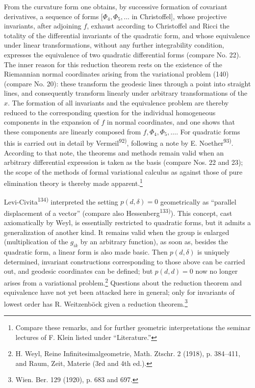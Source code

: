 \documentclass[11pt]{article}
\begin{document}
From the curvature form one obtains, by successive formation of covariant derivatives, a sequence of forms $[\Phi_4,\Phi_5,\ldots$ in Christoffel], whose projective invariants, after adjoining $f$, exhaust according to Christoffel and Ricci the totality of the differential invariants of the quadratic form, and whose equivalence under linear transformations, without any further integrability condition, expresses the equivalence of two quadratic differential forms (compare No. 22). The inner reason for this reduction theorem rests on the existence of the Riemannian normal coordinates arising from the variational problem (140) (compare No. 20): these transform the geodesic lines through a point into straight lines, and consequently transform linearly under arbitrary transformations of the $x$. The formation of all invariants and the equivalence problem are thereby reduced to the corresponding question for the individual homogeneous components in the expansion of $f$ in normal coordinates, and one shows that these components are linearly composed from $f,\Phi_4,\Phi_5,\ldots$. For quadratic forms this is carried out in detail by Vermeil\textsuperscript{92)}, following a note by E. Noether\textsuperscript{93)}. According to that note, the theorems and methods remain valid when an arbitrary differential expression is taken as the basis (compare Nos. 22 and 23); the scope of the methods of formal variational calculus as against those of pure elimination theory is thereby made apparent.\footnote{Compare these remarks, and for further geometric interpretations the seminar lectures of F. Klein listed under ``Literature.''}

Levi-Civita\textsuperscript{134)} interpreted the setting $p(d,\delta)=0$ geometrically as ``parallel displacement of a vector'' (compare also Hessenberg\textsuperscript{133)}). This concept, cast axiomatically by Weyl, is essentially restricted to quadratic forms, but it admits a generalization of another kind. It remains valid when the group is enlarged (multiplication of the $g_{ik}$ by an arbitrary function), as soon as, besides the quadratic form, a linear form is also made basic. Then $p(d,\delta)$ is uniquely determined, invariant constructions corresponding to those above can be carried out, and geodesic coordinates can be defined; but $p(d,d)=0$ now no longer arises from a variational problem.\footnote{H. Weyl, Reine Infinitesimalgeometrie, Math. Ztschr. 2 (1918), p. 384--411, and Raum, Zeit, Materie (3rd and 4th ed.).} Questions about the reduction theorem and equivalence have not yet been attacked here in general; only for invariants of lowest order has R. Weitzenböck given a reduction theorem.\footnote{Wien. Ber. 129 (1920), p. 683 and 697.}
\end{document}
